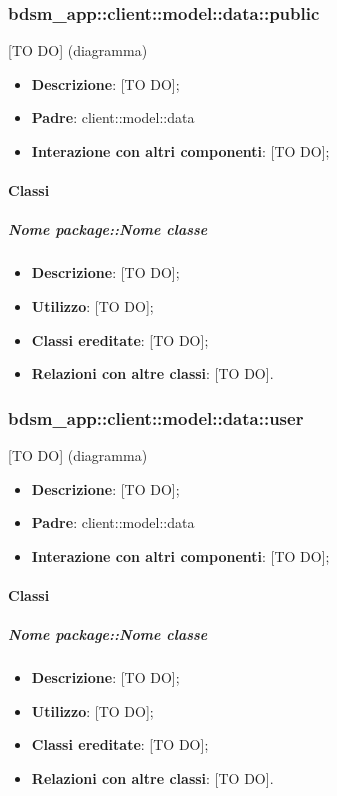 \subsubsection{bdsm\_app::client::model::data::public} %
\label{ssub:bdsm_app_client_model_data_public}
[TO DO] (diagramma) \newline \newline

\begin{itemize}
	\item \textbf{Descrizione}: [TO DO];
	\item \textbf{Padre}: client::model::data
	\item \textbf{Interazione con altri componenti}: [TO DO];
\end{itemize}

	\paragraph{Classi} %
		\subparagraph{Nome package::Nome classe} %
		\label{subp:subparagraph_name}
			\begin{itemize}
				\item \textbf{Descrizione}: [TO DO];
				\item \textbf{Utilizzo}: [TO DO];
				\item \textbf{Classi ereditate}: [TO DO];
				\item \textbf{Relazioni con altre classi}: [TO DO].
			\end{itemize}	

\subsubsection{bdsm\_app::client::model::data::user} %
\label{ssub:bdsm_app_client_model_data_user}
[TO DO] (diagramma) \newline \newline

\begin{itemize}
	\item \textbf{Descrizione}: [TO DO];
	\item \textbf{Padre}: client::model::data
	\item \textbf{Interazione con altri componenti}: [TO DO];
\end{itemize}

	\paragraph{Classi} %
		\subparagraph{Nome package::Nome classe} %
		\label{subp:subparagraph_name}
			\begin{itemize}
				\item \textbf{Descrizione}: [TO DO];
				\item \textbf{Utilizzo}: [TO DO];
				\item \textbf{Classi ereditate}: [TO DO];
				\item \textbf{Relazioni con altre classi}: [TO DO].
			\end{itemize}	

